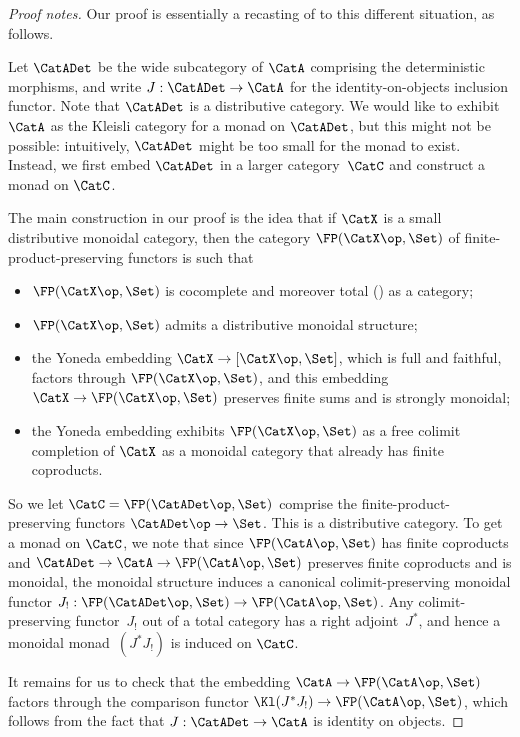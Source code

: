 \begin{proof}[Proof notes]
  Our proof is essentially a recasting of \cite[\S 7]{power-universal} to this different
  situation, as follows. 
  
  Let $\CatADet$ be the wide subcategory of $\CatA$ comprising the
  deterministic morphisms, and write $J:\CatADet\to\CatA$ for the
  identity-on-objects inclusion functor. Note that $\CatADet$ is a distributive category. We would
  like to exhibit $\CatA$ as the Kleisli category for a monad on
  $\CatADet$, but this might not be possible: intuitively, $\CatADet$
  might be too small for the monad to exist. Instead, we first embed
  $\CatADet$ in a larger category~$\CatC$ and construct a monad on $\CatC$.

  The main construction in our proof is the idea that if $\CatX$ is a
  small distributive monoidal category, then the category
  $\FP(\CatX\op,\Set)$
  of finite-product-preserving functors is such that
  \begin{itemize}
  \item   $\FP(\CatX\op,\Set)$ is cocomplete and moreover total (\cite{STREET1978350}) as a
    category;
  \item $\FP(\CatX\op,\Set)$ admits a distributive monoidal structure;
  \item   the Yoneda embedding $\CatX\to[\CatX\op,\Set]$, which is
    full and faithful, factors through
    $\FP(\CatX\op,\Set)$,
    and this embedding $\CatX\to \FP(\CatX\op,\Set)$ preserves finite sums and is
    strongly monoidal;
  \item  the Yoneda embedding exhibits $\FP(\CatX\op,\Set)$ as a free
    colimit completion of $\CatX$ as a monoidal category that already has
    finite coproducts.
  \end{itemize}

  So we let $\CatC=\FP(\CatADet\op,\Set)$ comprise the
  finite-product-preserving functors $\CatADet\op\to \Set$.
  This is a distributive category. 
  To get a monad on $\CatC$, we note that since
  $\FP(\CatA\op,\Set)$ has finite coproducts and
  $\CatADet\to \CatA\to \FP(\CatA\op,\Set)$  preserves finite
  coproducts and is monoidal, the
  monoidal structure
  induces a canonical colimit-preserving monoidal functor
  $J_!:\FP(\CatADet\op,\Set)\to \FP(\CatA\op,\Set)$.
  Any colimit-preserving functor~$J_!$ out of a total category 
  has a right adjoint~$J^*$, and hence a monoidal monad~$(J^*J_!)$ is induced on
  $\CatC$. 
  
  It remains for us to check that the embedding $\CatA\to
  \FP(\CatA\op,\Set)$ factors through the comparison functor
  $\Kl(J^*J_!)\to \FP(\CatA\op,\Set)$, which follows from the fact
  that $J:\CatADet\to\CatA$ is identity on objects.
\end{proof}
